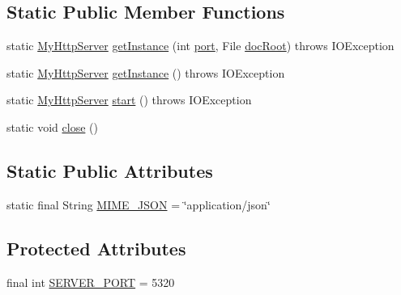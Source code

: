 \subsection*{\-Static \-Public \-Member \-Functions}
\begin{DoxyCompactItemize}
\item 
static \hyperlink{classcom_1_1axcoto_1_1shinjuku_1_1maki_1_1_my_http_server}{\-My\-Http\-Server} \hyperlink{classcom_1_1axcoto_1_1shinjuku_1_1maki_1_1_my_http_server_a29fd6128c03ceddce905c0d80526a6e7}{get\-Instance} (int \hyperlink{classcom_1_1axcoto_1_1shinjuku_1_1maki_1_1_my_http_server_a63c89c04d1feae07ca35558055155ffb}{port}, \-File \hyperlink{classcom_1_1axcoto_1_1shinjuku_1_1maki_1_1_my_http_server_a7b52e0245ff0ba71b7b288bc51f1e18a}{doc\-Root})  throws I\-O\-Exception
\item 
static \hyperlink{classcom_1_1axcoto_1_1shinjuku_1_1maki_1_1_my_http_server}{\-My\-Http\-Server} \hyperlink{classcom_1_1axcoto_1_1shinjuku_1_1maki_1_1_my_http_server_aeb7141da6a35668710696b70bc41b798}{get\-Instance} ()  throws I\-O\-Exception
\item 
static \hyperlink{classcom_1_1axcoto_1_1shinjuku_1_1maki_1_1_my_http_server}{\-My\-Http\-Server} \hyperlink{classcom_1_1axcoto_1_1shinjuku_1_1maki_1_1_my_http_server_a0fecfa88b1a6d46c8877d4a954961909}{start} ()  throws I\-O\-Exception
\item 
static void \hyperlink{classcom_1_1axcoto_1_1shinjuku_1_1maki_1_1_my_http_server_a83ca59777c4b85fd50a9c8270deda46c}{close} ()
\end{DoxyCompactItemize}
\subsection*{\-Static \-Public \-Attributes}
\begin{DoxyCompactItemize}
\item 
static final \-String \hyperlink{classcom_1_1axcoto_1_1shinjuku_1_1maki_1_1_my_http_server_aa6b5365a78d25ddab0d09bd51aa0512e}{\-M\-I\-M\-E\-\_\-\-J\-S\-O\-N} = \char`\"{}application/json\char`\"{}
\end{DoxyCompactItemize}
\subsection*{\-Protected \-Attributes}
\begin{DoxyCompactItemize}
\item 
final int \hyperlink{classcom_1_1axcoto_1_1shinjuku_1_1maki_1_1_my_http_server_a68f9973d11588790c24066bae3a3cb87}{\-S\-E\-R\-V\-E\-R\-\_\-\-P\-O\-R\-T} = 5320
\end{DoxyCompactItemize}
